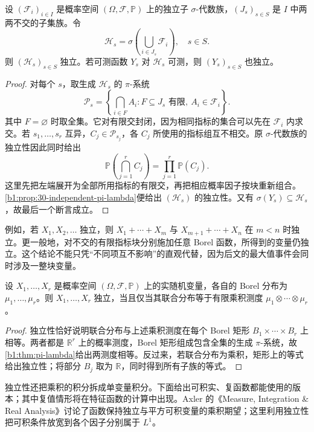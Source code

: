 \begin{proposition}[不交分块保持独立性]\label{b1:prop:30-independent-blocks}
设 \((\mathcal F_i)_{i\in I}\) 是概率空间 \((\Omega,\mathcal F,\mathbb P)\) 上的独立子 \(\sigma\)-代数族，\((J_s)_{s\in S}\) 是 \(I\) 中两两不交的子集族。令
\[
 \mathcal H_s=\sigma\left(\bigcup_{i\in J_s}\mathcal F_i\right),
 \quad s\in S.
\]
则 \((\mathcal H_s)_{s\in S}\) 独立。若可测函数 \(Y_s\) 对 \(\mathcal H_s\) 可测，则 \((Y_s)_{s\in S}\) 也独立。
\end{proposition}
\begin{proof}
对每个 \(s\)，取生成 \(\mathcal H_s\) 的 \(\pi\)-系统
\[
 \mathcal P_s=\left\{\bigcap_{i\in F}A_i:
 F\subseteq J_s\text{ 有限},\ A_i\in\mathcal F_i\right\}.
\]
其中 \(F=\varnothing\) 时取全集。它对有限交封闭，因为相同指标的集合可以先在 \(\mathcal F_i\) 内求交。若 \(s_1,\ldots,s_r\) 互异，\(C_j\in\mathcal P_{s_j}\)，各 \(C_j\) 所使用的指标组互不相交。原 \(\sigma\)-代数族的独立性因此同时给出
\[
 \mathbb P\left(\bigcap_{j=1}^rC_j\right)
 =\prod_{j=1}^r\mathbb P(C_j).
\]
这里先把左端展开为全部所用指标的有限交，再把相应概率因子按块重新组合。\cref{b1:prop:30-independent-pi-lambda}便给出 \((\mathcal H_s)\) 的独立性。又有 \(\sigma(Y_s)\subseteq\mathcal H_s\)，故最后一个断言成立。
\end{proof}

例如，若 \(X_1,X_2,\ldots\) 独立，则 \(X_1+\cdots+X_m\) 与 \(X_{m+1}+\cdots+X_n\) 在 \(m<n\) 时独立。更一般地，对不交的有限指标块分别施加任意 Borel 函数，所得到的变量仍独立。这个结论不能只凭“不同项互不影响”的直观代替，因为后文的最大值事件会同时涉及一整块变量。

\begin{proposition}[联合分布与乘积]\label{b1:prop:30-independent-joint-law}
设 \(X_1,\ldots,X_r\) 是概率空间 \((\Omega,\mathcal F,\mathbb P)\) 上的实随机变量，各自的 Borel 分布为 \(\mu_1,\ldots,\mu_r\)。则 \(X_1,\ldots,X_r\) 独立，当且仅当其联合分布等于有限乘积测度 \(\mu_1\otimes\cdots\otimes\mu_r\)。
\end{proposition}
\begin{proof}
独立性恰好说明联合分布与上述乘积测度在每个 Borel 矩形 \(B_1\times\cdots\times B_r\) 上相等。两者都是 \(\mathbb R^r\) 上的概率测度，Borel 矩形组成包含全集的生成 \(\pi\)-系统，故\cref{b1:thm:pi-lambda}给出两测度相等。反过来，若联合分布为乘积，矩形上的等式给出独立性；将部分 \(B_j\) 取为 \(\mathbb R\)，同时得到所有子族的等式。
\end{proof}

独立性还把乘积的积分拆成单变量积分。下面给出可积实、复函数都能使用的版本；其中复值情形将在特征函数的计算中出现。Axler 的《Measure, Integration \& Real Analysis》\cite[12.16--12.17, pp.~387--388]{Axler2020Measure}讨论了函数保持独立与平方可积变量的乘积期望；这里利用独立性把可积条件放宽到各个因子分别属于 \(L^1\)。

